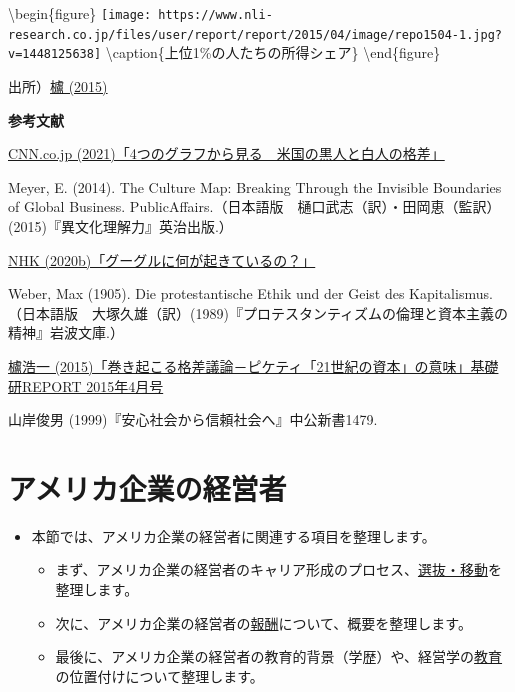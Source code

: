 \documentclass[
]{book}
\begin{document}
\textbackslash begin\{figure\}
\texttt{[image: https://www.nli-research.co.jp/files/user/report/report/2015/04/image/repo1504-1.jpg?v=1448125638]} \textbackslash caption\{上位1\%の人たちの所得シェア\}\label{fig:inequality}
\textbackslash end\{figure\}

出所）\href{https://www.nli-research.co.jp/report/detail/id=42347?site=nli}{櫨 (2015)}

{\textbf{参考文献}}

\href{https://www.cnn.co.jp/business/35172251.html}{CNN.co.jp (2021)「4つのグラフから見る　米国の黒人と白人の格差」}

Meyer, E. (2014). The Culture Map: Breaking Through the Invisible Boundaries of Global Business. PublicAffairs.（日本語版　樋口武志（訳）・田岡恵（監訳）(2015)『異文化理解力』英治出版.）

\href{https://www3.nhk.or.jp/news/special/sakusakukeizai/articles/20201023.html}{NHK (2020b)「グーグルに何が起きているの？」}

Weber, Max (1905). Die protestantische Ethik und der Geist des Kapitalismus. （日本語版　大塚久雄（訳）(1989)『プロテスタンティズムの倫理と資本主義の精神』岩波文庫.）

\href{https://www.nli-research.co.jp/files/topics/42347_ext_18_0.pdf?site=nli}{櫨浩一 (2015)「巻き起こる格差議論－ピケティ「21世紀の資本」の意味」基礎研REPORT 2015年4月号}

山岸俊男 (1999)『安心社会から信頼社会へ』中公新書1479.

\hypertarget{us-manager}{%
\section{アメリカ企業の経営者}\label{us-manager}}

\begin{itemize}
\item
  本節では、アメリカ企業の経営者に関連する項目を整理します。

  \begin{itemize}
  \item
    まず、アメリカ企業の経営者のキャリア形成のプロセス、\protect\hyperlink{us-selection}{選抜・移動}を整理します。
  \item
    次に、アメリカ企業の経営者の\protect\hyperlink{us-payment}{報酬}について、概要を整理します。
  \item
    最後に、アメリカ企業の経営者の教育的背景（学歴）や、経営学の\protect\hyperlink{us-education}{教育}の位置付けについて整理します。
  \end{itemize}
\end{itemize}
\end{document}
